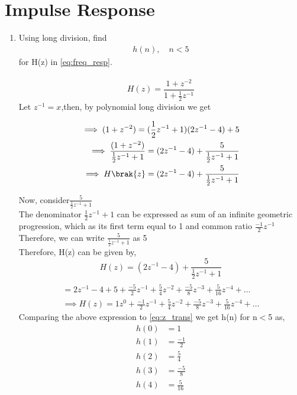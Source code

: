 \documentclass[journal,12pt,twocolumn]{IEEEtran}
\renewcommand\thesection{\arabic{section}}
\begin{document}
\section{Impulse Response}
\begin{enumerate}[label=\thesection.\arabic*]
	\item Using long division, 
find
		\begin{align}
			h(n), \quad n < 5
		\end{align}
		for H(z) in 
		\eqref{eq:freq_resp}.
	\\\solution\\
	\begin{equation}
		H(z) = \frac{1 + z^{-2}}{1 + \frac{1}{2} z^{-1}}
	\end{equation}
	Let $z^{-1} = x$,then, by polynomial long division we get
	
\begin{align}
	\implies (1+z^{-2})= (\frac{1}{2} z^{-1}+1)(2z^{-1}-4) + 5
	\\\implies \frac{(1+z^{-2})}{\frac{1}{2} z^{-1}+1}= (2z^{-1}-4) + \frac{5}{\frac{1}{2} z^{-1}+1}
	\\\implies H\brak{z}=(2z^{-1}-4) + \frac{5}{\frac{1}{2} z^{-1}+1}
\end{align}

Now, consider$ \frac{5}{\frac{1}{2} z^{-1}+1}$
\\The denominator $\frac{1}{2} z^{-1}+1$ can be expressed as sum of an infinite geometric progression, which as its first term equal to 1 and common ratio $\frac{-1}{2}z^{-1}$
\\Therefore, we can write $ \frac{5}{\frac{1}{2} z^{-1}+1}$ as 5	
\\Therefore, H(z) can be given by,
\\\begin{equation}
	H(z)= (2z^{-1}-4) + \frac{5}{\frac{1}{2} z^{-1}+1}
\end{equation}
\begin{align}
	\\= 2z^{-1} - 4 + 5 + \frac{-5}{2}z^{-1} + \frac{5}{4}z^{-2} + \frac{-5}{8}z^{-3} + \frac{5}{16}z^{-4} + \dots
	\\\implies H(z)= 1z^{0} + \frac{-1}{2}z^{-1} +\frac{5}{4}z^{-2} + \frac{-5}{8}z^{-3} +\frac{5}{16}z^{-4} +\dots
\end{align}
Comparing the above expression to \eqref{eq:z_trans} we get h(n) for n$<$5 as, \\
\begin{align} 
	h(0) &= 1
	\\h(1) &= \frac{-1}{2}
	\\h(2) &= \frac{5}{4}
	\\h(3) &= \frac{-5}{8}
	\\h(4) &= \frac{5}{16}
\end{align}



\end{enumerate}
\end{document}
